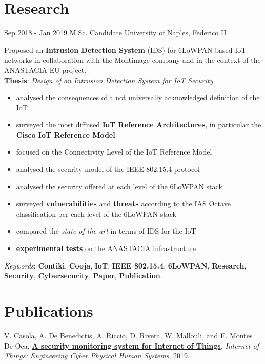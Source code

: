 \documentclass[letterpaper]{twentysecondcv} %
\begin{document}
\section{Research}
\begin{twenty}
	\twentyitem
    	{Sep 2018 -}
		{Jan 2019}
        {M.Sc. Candidate}
        {\href{http://www.scuolapsb.unina.it/}{University of Naples, Federico II}}
        {}
        {
           Proposed an \textbf{Intrusion Detection System} (IDS) for 6LoWPAN-based IoT networks in collaboration with the Montimage company and in the context of the ANASTACIA EU project.\\
            \textbf{Thesis}: \textit{Design of an Intrusion Detection System for IoT Security}
            {
                \begin{itemize}
                    \item analysed the consequences of a not universally acknowledged definition of the IoT
                    \item surveyed the most diffused \textbf{IoT Reference Architectures}, in particular the \textbf{Cisco IoT Reference Model}
                    \item focused on the Connectivity Level of the IoT Reference Model
                    \item analysed the security model of the IEEE 802.15.4 protocol
                    \item analysed the security offered at each level of the 6LoWPAN stack
                    \item surveyed \textbf{vulnerabilities} and \textbf{threats} according to the IAS Octave classification per each level of the 6LoWPAN stack
                    \item compared the \textit{state-of-the-art} in terms of IDS for the IoT
                    \item \textbf{experimental tests} on the ANASTACIA infrastructure
                \end{itemize}
            }
            \textit{Keywords}: \textbf{Contiki}, \textbf{Cooja}, \textbf{IoT}, \textbf{IEEE 802.15.4}, \textbf{6LoWPAN}, \textbf{Research}, \textbf{Security}, \textbf{Cybersecurity}, \textbf{Paper}, \textbf{Publication}.
        }
\end{twenty}
%
%
\section{Publications}
 V. Casola, A. De Benedictis, A. Riccio, D. Rivera, W. Mallouli, and E. Montes De Oca, \href{https://www.researchgate.net/publication/334175322_A_security_monitoring_system_for_Internet_of_Things}{\textbf{A security monitoring system for Internet of Things}}. \textit{Internet of Things: Engineering Cyber Physical Human Systems}, 2019.
%
%
\end{document}
